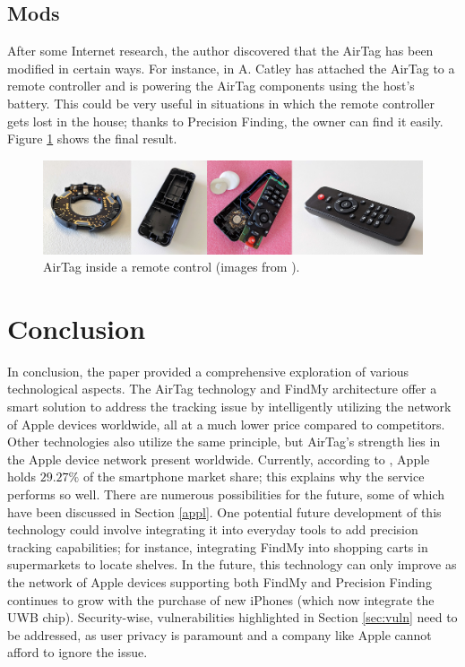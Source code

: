 \documentclass[english]{article}
\begin{document}
\subsection{Mods}
After some Internet research, the author discovered that the AirTag has been modified in certain ways. For instance, in \cite{telecomando} A. Catley has attached the AirTag to a remote controller and is powering the AirTag components using the host's battery. This could be very useful in situations in which the remote controller gets lost in the house; thanks to Precision Finding, the owner can find it easily. Figure \ref{img:controller} shows the final result.
\begin{figure}[]
	\centering
	\includegraphics[width=\textwidth]{images/remote.jpg}
	\caption{AirTag inside a remote control (images from \cite{reverse}).}
	\label{img:controller}
\end{figure}


\section{Conclusion}
In conclusion, the paper provided a comprehensive exploration of various technological aspects. The AirTag technology and FindMy architecture offer a smart solution to address the tracking issue by intelligently utilizing the network of Apple devices worldwide, all at a much lower price compared to competitors. Other technologies also utilize the same principle, but AirTag's strength lies in the Apple device network present worldwide. Currently, according to \cite{Lin}, Apple holds $29.27\%$ of the smartphone market share; this explains why the service performs so well. There are numerous possibilities for the future, some of which have been discussed in Section \ref{appl}. One potential future development of this technology could involve integrating it into everyday tools to add precision tracking capabilities; for instance, integrating FindMy into shopping carts in supermarkets to locate shelves. In the future, this technology can only improve as the network of Apple devices supporting both FindMy and Precision Finding continues to grow with the purchase of new iPhones (which now integrate the UWB chip). Security-wise, vulnerabilities highlighted in Section \ref{sec:vuln} need to be addressed, as user privacy is paramount and a company like Apple cannot afford to ignore the issue.
\printbibliography
\nocite{*}
\end{document}
